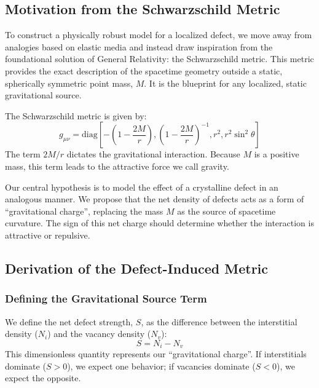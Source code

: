 \documentclass[%
  reprint,
  superscriptaddress,
  showpacs,
  showkeys,
  amsmath,amssymb,
  pra,
  longbibliography,
  floatfix,
]{revtex4-2}
\begin{document}
\subsection{Motivation from the Schwarzschild Metric}

To construct a physically robust model for a localized defect, we move away from analogies based on elastic media and instead draw inspiration from the foundational solution of General Relativity: the Schwarzschild metric. This metric provides the exact description of the spacetime geometry outside a static, spherically symmetric point mass, $M$. It is the blueprint for any localized, static gravitational source.

The Schwarzschild metric is given by:
\begin{equation}
g_{\mu\nu} = \text{diag}\left[-\left(1 - \frac{2M}{r}\right), \left(1 - \frac{2M}{r}\right)^{-1}, r^2, r^2 \sin^2 \theta\right]
\label{eq:schwarzschild}
\end{equation}
The term $2M/r$ dictates the gravitational interaction. Because $M$ is a positive mass, this term leads to the attractive force we call gravity.

Our central hypothesis is to model the effect of a crystalline defect in an analogous manner. We propose that the net density of defects acts as a form of ``gravitational charge'', replacing the mass $M$ as the source of spacetime curvature. The sign of this net charge should determine whether the interaction is attractive or repulsive.

\subsection{Derivation of the Defect-Induced Metric}

\subsubsection{Defining the Gravitational Source Term}

We define the net defect strength, $S$, as the difference between the interstitial density ($N_i$) and the vacancy density ($N_v$):
\begin{equation}
S = N_i - N_v
\end{equation}
This dimensionless quantity represents our ``gravitational charge''. If interstitials dominate ($S>0$), we expect one behavior; if vacancies dominate ($S<0$), we expect the opposite.
\end{document}
